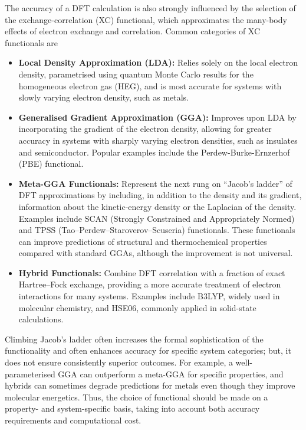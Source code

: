 The accuracy of a DFT calculation is also strongly influenced by the selection of the exchange-correlation (XC) functional, which approximates the many-body effects of electron exchange and correlation. Common categories of XC functionals are
\begin{itemize}
    \item[1] \textbf{Local Density Approximation (LDA):} Relies solely on the local electron density, parametrised using quantum Monte Carlo results for the homogeneous electron gas (HEG), and is most accurate for systems with slowly varying electron density, such as metals.
    \item[2] \textbf{Generalised Gradient Approximation (GGA):} Improves upon LDA by incorporating the gradient of the electron density, allowing for greater accuracy in systems with sharply varying electron densities, such as insulates and semiconductor. Popular examples include the Perdew-Burke-Ernzerhof (PBE) functional.
    \item[3] \textbf{Meta-GGA Functionals:} Represent the next rung on “Jacob’s ladder” of DFT approximations by including, in addition to the density and its gradient, information about the kinetic-energy density or the Laplacian of the density. Examples include SCAN (Strongly Constrained and Appropriately Normed) \cite{Sun2015} and TPSS (Tao–Perdew–Staroverov–Scuseria) \cite{Tao2003} functionals. These functionals can improve predictions of structural and thermochemical properties compared with standard GGAs, although the improvement is not universal.
    \item[4] \textbf{Hybrid Functionals:} Combine DFT correlation with a fraction of exact Hartree–Fock exchange, providing a more accurate treatment of electron interactions for many systems. Examples include B3LYP, widely used in molecular chemistry, and HSE06, commonly applied in solid-state calculations. 
\end{itemize}

Climbing Jacob's ladder \cite{Tao2003} often increases the formal sophistication of the functionality and often enhances accuracy for specific system categories; but, it does not ensure consistently superior outcomes.  
For example, a well-parameterised GGA can outperform a meta-GGA for specific properties, and hybrids can sometimes degrade predictions for metals even though they improve molecular energetics. 
Thus, the choice of functional should be made on a property- and system-specific basis, taking into account both accuracy requirements and computational cost.

